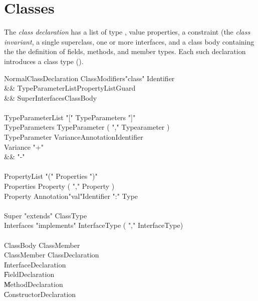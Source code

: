 \chapter{Classes}
\label{XtenClasses}

The {\em class declaration} has
a list of type \params,
value properties, 
a constraint (the {\em class invariant}, a single superclass,
one or more interfaces, and a class body containing the
the definition of
fields, methods, and member types.
Each such declaration introduces a class
type ().

\iftypeparams

\begin{grammar}
NormalClassDeclaration \:
      ClassModifiers\opt \xcd"class" Identifier  \\
   && TypeParameterList\opt PropertyList\opt Guard\opt \\
   && Super\opt Interfaces\opt ClassBody \\
\\
TypeParameterList     \:  \xcd"[" TypeParameters \xcd"]" \\
TypeParameters        \:  TypeParameter ( \xcd"," Typearameter )\star \\
TypeParameter         \:  Variance\opt Annotation\star Identifier     \\
Variance \: \xcd"+" \\
         && \xcd"-" \\
\\
PropertyList     \:  \xcd"(" Properties \xcd")" \\
Properties       \:  Property ( \xcd"," Property )\star \\
Property         \:  Annotation\star \xcd"val"\opt Identifier \xcd":" Type \\
\\
Super \: \xcd"extends" ClassType \\
Interfaces \: \xcd"implements" InterfaceType ( \xcd"," InterfaceType)\star \\
\\
ClassBody \: ClassMember\star \\
ClassMember \: ClassDeclaration \\
            \| InterfaceDeclaration \\
            \| FieldDeclaration \\
            \| MethodDeclaration \\
            \| ConstructorDeclaration \\
\end{grammar}

